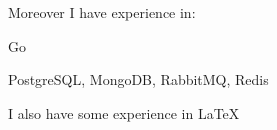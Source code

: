 Moreover I have experience in:
\begin{bulist}
  \item Go
  \item PostgreSQL, MongoDB, RabbitMQ, Redis
\end{bulist}
I also have some experience in \LaTeX
